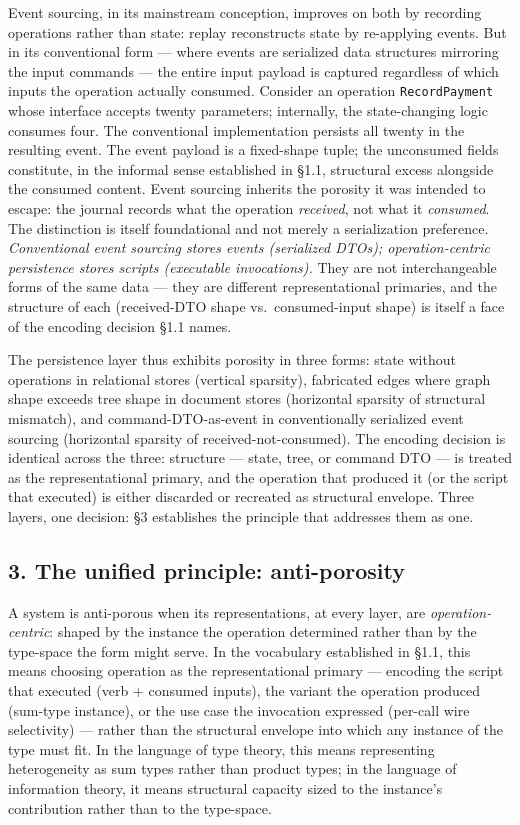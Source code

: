 \documentclass[
]{article}
\let\origtexttt\texttt%
\renewcommand{\texttt}[1]{\origtexttt{\seqsplit{#1}}}%
\let\texttt\origtexttt%
\begin{document}
Event sourcing, in its mainstream conception, improves on both by
recording operations rather than state: replay reconstructs state by
re-applying events. But in its conventional form --- where events are
serialized data structures mirroring the input commands --- the entire
input payload is captured regardless of which inputs the operation
actually consumed. Consider an operation \texttt{RecordPayment} whose
interface accepts twenty parameters; internally, the state-changing
logic consumes four. The conventional implementation persists all twenty
in the resulting event. The event payload is a fixed-shape tuple; the
unconsumed fields constitute, in the informal sense established in §1.1,
structural excess alongside the consumed content. Event sourcing
inherits the porosity it was intended to escape: the journal records
what the operation \emph{received}, not what it \emph{consumed}. The
distinction is itself foundational and not merely a serialization
preference. \emph{Conventional event sourcing stores events (serialized
DTOs); operation-centric persistence stores scripts (executable
invocations).} They are not interchangeable forms of the same data ---
they are different representational primaries, and the structure of each
(received-DTO shape vs.~consumed-input shape) is itself a face of the
encoding decision §1.1 names.

The persistence layer thus exhibits porosity in three forms: state
without operations in relational stores (vertical sparsity), fabricated
edges where graph shape exceeds tree shape in document stores
(horizontal sparsity of structural mismatch), and command-DTO-as-event
in conventionally serialized event sourcing (horizontal sparsity of
received-not-consumed). The encoding decision is identical across the
three: structure --- state, tree, or command DTO --- is treated as the
representational primary, and the operation that produced it (or the
script that executed) is either discarded or recreated as structural
envelope. Three layers, one decision: §3 establishes the principle that
addresses them as one.

\subsection{3. The unified principle:
anti-porosity}\label{the-unified-principle-anti-porosity}

A system is anti-porous when its representations, at every layer, are
\emph{operation-centric}: shaped by the instance the operation
determined rather than by the type-space the form might serve. In the
vocabulary established in §1.1, this means choosing operation as the
representational primary --- encoding the script that executed (verb +
consumed inputs), the variant the operation produced (sum-type
instance), or the use case the invocation expressed (per-call wire
selectivity) --- rather than the structural envelope into which any
instance of the type must fit. In the language of type theory, this
means representing heterogeneity as sum types rather than product types;
in the language of information theory, it means structural capacity
sized to the instance's contribution rather than to the type-space.
\end{document}
